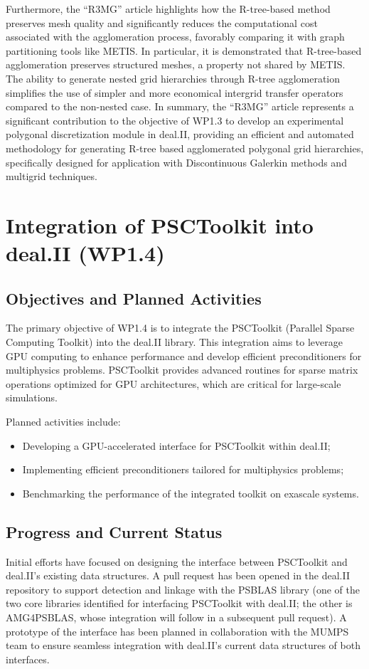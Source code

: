 \documentclass[a4paper,12pt]{article}
\begin{document}
Furthermore, the ``R3MG'' article highlights how the R-tree-based method preserves
mesh quality and significantly reduces the computational cost associated with
the agglomeration process, favorably comparing it with graph partitioning tools
like METIS. In particular, it is demonstrated that R-tree-based agglomeration
preserves structured meshes, a property not shared by METIS. The ability to
generate nested grid hierarchies through R-tree agglomeration simplifies the use
of simpler and more economical intergrid transfer operators compared to the
non-nested case. In summary, the ``R3MG'' article represents a significant
contribution to the objective of WP1.3 to develop an experimental polygonal
discretization module in deal.II, providing an efficient and automated
methodology for generating R-tree based agglomerated polygonal grid hierarchies,
specifically designed for application with Discontinuous Galerkin methods and
multigrid techniques.

\section{Integration of PSCToolkit into deal.II (WP1.4)}
    \subsection{Objectives and Planned Activities}
        The primary objective of WP1.4 is to integrate the PSCToolkit (Parallel Sparse Computing Toolkit) into the deal.II library. This integration aims to leverage GPU computing to enhance performance and develop efficient preconditioners for multiphysics problems. PSCToolkit provides advanced routines for sparse matrix operations optimized for GPU architectures, which are critical for large-scale simulations.

        Planned activities include:
        \begin{itemize}
            \item Developing a GPU-accelerated interface for PSCToolkit within deal.II;
            \item Implementing efficient preconditioners tailored for multiphysics problems;
            \item Benchmarking the performance of the integrated toolkit on exascale systems.
        \end{itemize}

        \subsection{Progress and Current Status}
        Initial efforts have focused on designing the interface between PSCToolkit and deal.II's existing data structures. A pull request has been opened in the deal.II repository to support detection and linkage with the PSBLAS library (one of the two core libraries identified for interfacing PSCToolkit with deal.II; the other is AMG4PSBLAS, whose integration will follow in a subsequent pull request). A prototype of the interface has been planned in collaboration with the MUMPS team to ensure seamless integration with deal.II's current data structures of both interfaces.
\end{document}
